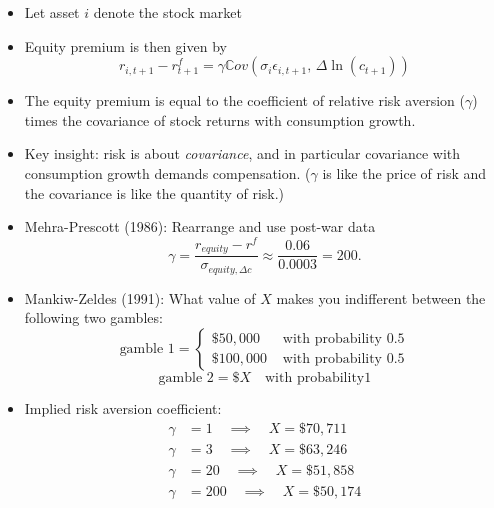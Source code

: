 \documentclass[10pt]{beamer}
\begin{document}
\begin{frame}{}
\begin{itemize}
\item Let asset $i$ denote the stock market

\item Equity premium is then given by
\begin{equation*}
	r_{i, t+1} - r_{t+1}^f = \gamma \mathbb Cov(\sigma_i \epsilon_{i, t+1}, \, \Delta \ln(c_{t+1}))
\end{equation*}

\item The equity premium is equal to the coefficient of relative risk aversion ($\gamma$) times the covariance of stock returns with consumption growth. 

\item Key insight: risk is about \textit{covariance}, and in particular covariance with consumption growth demands compensation. ($\gamma$ is like the price of risk and the covariance is like the quantity of risk.)

\item Mehra-Prescott (1986): Rearrange and use post-war data 
\begin{equation*}
	\gamma = \frac{r_{equity} - r^f}{\sigma_{equity, \Delta c}} \approx \frac{0.06}{0.0003} = 200.
\end{equation*}

\end{itemize}
\end{frame}


\begin{frame}{}
\begin{itemize}
\item Mankiw-Zeldes (1991): What value of $X$ makes you indifferent between the following two gambles: 
\begin{equation*}
	\text{gamble 1} = \begin{cases}
		\$ 50,000 & \text{ with probability } 0.5 \\
		\$ 100,000 & \text{ with probability } 0.5
	\end{cases}
\end{equation*}
\begin{equation*}
	\text{gamble 2} = \$ X \quad \text{with probability} 1
\end{equation*}

\item Implied risk aversion coefficient: 
\begin{align*}
	\gamma &= 1 \quad \implies \quad X = \$70,711 \\ 
	\gamma &= 3 \quad \implies \quad X = \$63,246 \\ 
	\gamma &= 20 \quad \implies \quad X = \$51,858 \\ 
	\gamma &= 200 \quad \implies \quad X = \$50,174 \\ 
\end{align*}

\end{itemize}
\end{frame}
\end{document}
